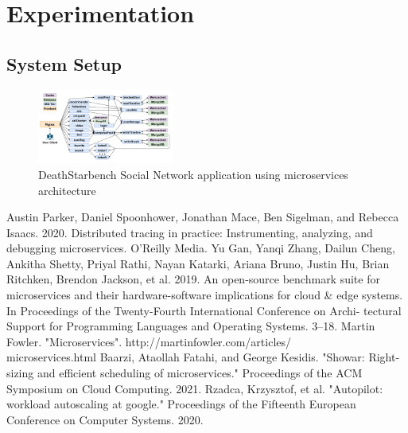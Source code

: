 \documentclass[conference]{IEEEtran}
\begin{document}
\section{Experimentation}

\subsection{System Setup}

\begin{figure}
    \begin{center}
        \includegraphics[width=0.4\textwidth]{figures/social-network.png}
    \end{center}
    \caption{DeathStarbench\cite{b2} Social Network application using microservices architecture}
    \label{fig:social-network}
\end{figure}


\begin{thebibliography}{00}
     Austin Parker, Daniel Spoonhower, Jonathan Mace, Ben Sigelman, and Rebecca Isaacs. 2020. Distributed tracing in practice: Instrumenting, analyzing, and debugging microservices. O’Reilly Media.
     Yu Gan, Yanqi Zhang, Dailun Cheng, Ankitha Shetty, Priyal Rathi, Nayan Katarki, Ariana Bruno, Justin Hu, Brian Ritchken, Brendon Jackson, et al. 2019. An open-source benchmark suite for microservices and their hardware-software implications for cloud \& edge systems. In Proceedings of the Twenty-Fourth International Conference on Archi- tectural Support for Programming Languages and Operating Systems. 3–18.
     \sloppy Martin Fowler. "Microservices". http://martinfowler.com/articles/\\microservices.html
     Baarzi, Ataollah Fatahi, and George Kesidis. "Showar: Right-sizing and efficient scheduling of microservices." Proceedings of the ACM Symposium on Cloud Computing. 2021.
     Rzadca, Krzysztof, et al. "Autopilot: workload autoscaling at google." Proceedings of the Fifteenth European Conference on Computer Systems. 2020.
\end{thebibliography}
\end{document}
